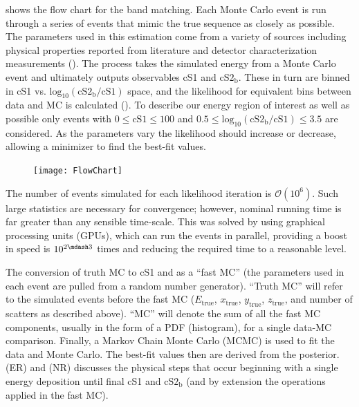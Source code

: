  shows the flow chart for the band matching.  Each Monte Carlo event is run
through a series of events that mimic the true sequence as closely as possible.  The parameters used in this estimation come from
a variety of sources including physical properties reported from literature and detector characterization measurements
().  The process takes the simulated energy from a Monte Carlo event and ultimately outputs observables cS1 and
$\mathrm{cS2_b}$.  These in turn are binned in cS1 vs. $\mathrm{log_{10}(cS2_b / cS1)}$ space, and the likelihood for equivalent bins
between data and MC is calculated ().  To describe our energy region of
interest as well as possible only events with $0 \leq \mathrm{cS1} \leq 100$ and $0.5 \leq \mathrm{log_{10}(cS2_b / cS1)} \leq 3.5$ are
considered.  As the parameters vary the likelihood should increase or decrease, allowing a minimizer to find the best-fit values.

\begin{figure}
\centering
\texttt{[image: FlowChart]}
\label{fig:er_nr_calibrations_parameter_determ_flow_chart}
\end{figure}

The number of events simulated for each likelihood iteration is $\mathcal{O}(10^6)$.  Such large statistics are necessary for convergence;
however, nominal running time is far greater than any sensible time-scale.  This was solved by using graphical processing units (GPUs),
which can run the events in parallel, providing a boost in speed is $10^{2 \mdash 3}$ times and reducing the required time to a
reasonable level.

The conversion of truth MC to cS1 and \cstwob as a ``fast MC'' (the parameters used in each event are pulled
from a random number generator).  ``Truth MC'' will refer to the simulated events before the fast MC ($E_{\mathrm{true}}$,
$x_{\mathrm{true}}$, $y_{\mathrm{true}}$, $z_{\mathrm{true}}$, and number
of scatters as described above).  ``MC'' will denote the sum of all the fast MC components, usually in the form of a PDF (histogram), for
a single data-MC comparison.  Finally, a Markov Chain Monte Carlo (MCMC) is used to fit the data and Monte Carlo.  The best-fit values
then are derived from the posterior.   (ER) and
 (NR) discusses the physical steps that occur beginning with a single energy
deposition until final cS1 and $\mathrm{cS2_b}$ (and by extension the operations applied in the fast MC).


